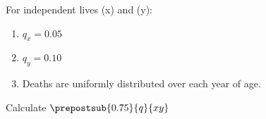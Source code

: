 For independent lives (x) and (y):
\begin{enumerate}
\item $q_x = 0.05$
\item $q_y = 0.10$
\item Deaths are uniformly distributed over each year of age.
\end{enumerate}
Calculate $\prepostsub{0.75}{q}{xy}$
